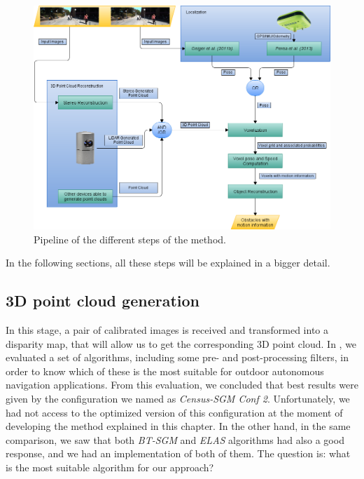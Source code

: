 \begin{figure}[thb]\label{fig:cp05_pipeline_general}
  \centering
  \includegraphics{pipeline_general}
  \caption{Pipeline of the different steps of the method.  }
\end{figure}

In the following sections, all these steps will be explained in a bigger detail.

\subsection{3D point cloud generation}\label{ch:chapter05_01_01}

In this stage, a pair of calibrated images is received and transformed into a disparity map, that will allow us to get the corresponding 3D point cloud. In , we evaluated a set of algorithms, including some pre- and post-processing filters, in order to know which of these is the most suitable for outdoor autonomous navigation applications. From this evaluation, we concluded that best results were given by the configuration we named as \emph{Census-SGM Conf 2}. Unfortunately, we had not access to the optimized version of this configuration at the moment of developing the method explained in this chapter. In the other hand, in the same comparison, we saw that both \emph{BT-SGM} and \emph{ELAS} algorithms had also a good response, and we had an implementation of both of them. The question is: what is the most suitable algorithm for our approach? 

